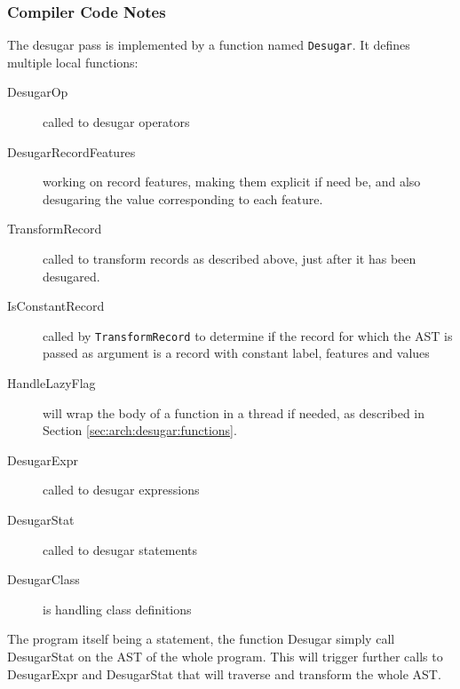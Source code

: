 \documentclass[a4paper]{memoir}
\begin{document}
\subsubsection{Compiler Code Notes}
The desugar pass is implemented by a function named \lstinline!Desugar!. It defines multiple local functions:
\begin{description}
  \item[DesugarOp] called to desugar operators
  \item[DesugarRecordFeatures] working on record features, making them explicit if need be, and also desugaring the value corresponding to each feature.
  \item[TransformRecord] called to transform records as described above, just after it has been desugared.
  \item[IsConstantRecord] called by \lstinline!TransformRecord! to determine if the record for which the AST is passed as argument is a record with constant label, features and values
  \item[HandleLazyFlag] will wrap the body of a function in a thread if needed, as described in Section \ref{sec:arch:desugar:functions}.
  \item[DesugarExpr] called to desugar expressions
  \item[DesugarStat] called to desugar statements
  \item[DesugarClass] is handling class definitions 
\end{description}

The program itself being a statement, the function Desugar simply call DesugarStat on the AST of the whole program. This will trigger further calls to DesugarExpr and DesugarStat that will traverse and transform the whole AST.
\end{document}
